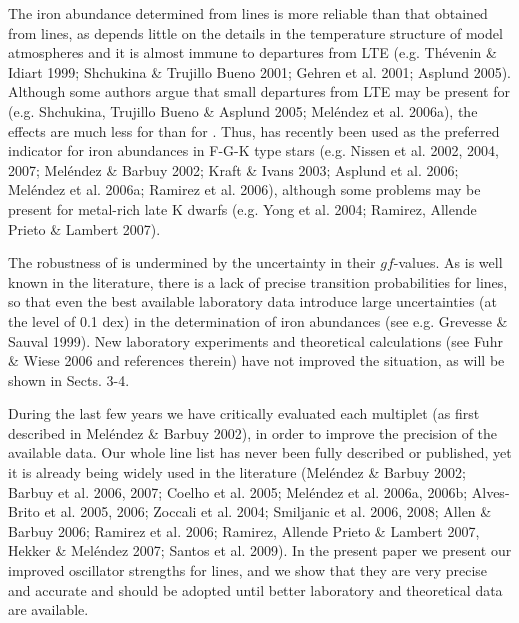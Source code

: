 \documentclass[traditabstract]{aa} %
\begin{document}
The iron abundance determined from  lines is more reliable 
than that obtained from  lines, as   depends little on the 
details in the temperature structure of model
atmospheres and it is almost immune to departures from LTE
(e.g. Th\'evenin \& Idiart 1999; Shchukina \& Trujillo Bueno 2001; Gehren et al. 2001; Asplund 2005).
Although some authors argue that small departures from LTE
may be present for  (e.g. Shchukina, Trujillo Bueno \& Asplund 2005;
Mel\'endez et al. 2006a), the effects are much less for  
than for . Thus,  has recently been
used as the preferred indicator for iron abundances in F-G-K type stars
(e.g. Nissen et al. 2002, 2004, 2007; Mel\'endez \& Barbuy 2002;
Kraft \& Ivans 2003; Asplund et al. 2006; Mel\'endez et al. 2006a; Ramirez et al. 2006),
although some problems may be present 
for metal-rich late K dwarfs (e.g. Yong et al. 2004;
Ramirez, Allende Prieto \& Lambert 2007).

The robustness of  is undermined by the
uncertainty in their $gf$-values. 
As is well known in the literature, there is a lack of precise
transition probabilities for  lines, so that even the best
available laboratory data introduce large uncertainties (at the level of 0.1 dex) 
in the determination of iron abundances (see e.g. Grevesse \& Sauval 1999).
New laboratory experiments and theoretical calculations 
(see Fuhr \& Wiese 2006 and references therein) have not improved
the situation, as will be shown in Sects. 3-4.

During the last few years we have critically evaluated each 
 multiplet (as first described in Mel\'endez \& Barbuy 2002), 
in order to improve the precision of the available data. 
Our whole line list has never been fully described or published, yet
it is already being widely used in the literature (Mel\'endez \& Barbuy 2002;
Barbuy et al. 2006, 2007; Coelho et al. 2005; Mel\'endez et al. 2006a, 2006b;
Alves-Brito et al. 2005, 2006; Zoccali et al. 2004; Smiljanic et al. 2006, 2008;
Allen \& Barbuy 2006; Ramirez et al. 2006; 
Ramirez, Allende Prieto \& Lambert 2007, Hekker \& Mel\'endez 2007; 
Santos et al. 2009). In the present 
paper we present our improved oscillator strengths for  lines,
and we show that they are very precise and accurate and should be
adopted until better laboratory and theoretical data are available.
\end{document}
